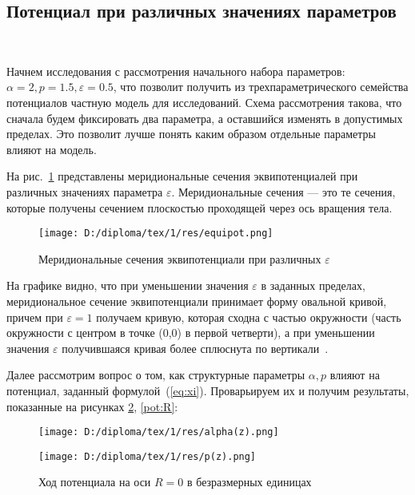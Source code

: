 \subsection{Потенциал при различных значениях параметров}

~\par
Начнем исследования с рассмотрения начального набора параметров: $\alpha = 2, p = 1.5, \varepsilon = 0.5$, что позволит получить из трехпараметрического семейства потенциалов частную модель для исследований. Схема рассмотрения такова, что сначала будем фиксировать два параметра, а оставшийся изменять в допустимых пределах. Это позволит лучше понять каким образом отдельные параметры влияют на модель.\par
На рис.~\ref{equipot} представлены меридиональные сечения эквипотенциалей при различных значениях параметра $\varepsilon$. Меридиональные сечения --- это те сечения, которые получены сечением плоскостью проходящей через ось вращения тела.

{
\begin{figure}[H]
    \centering
    \texttt{[image: D:/diploma/tex/1/res/equipot.png]}
    \caption{Меридиональные сечения эквипотенциали при различных $\varepsilon$}\label{equipot}
\end{figure}
}
{\flushleft На графике видно, что при уменьшении значения $\varepsilon$ в заданных пределах, меридиональное сечение эквипотенциали принимает форму овальной кривой, причем при $\varepsilon=1$ получаем кривую, которая сходна с частью окружности (часть окружности с центром в точке (0,0) в первой четверти), а при уменьшении значения $\varepsilon$ получившаяся кривая более сплюснута по вертикали~\cite{RaspopvaOssipkovJiang}.\par}
Далее рассмотрим вопрос о том, как структурные параметры $\alpha, p$ влияют на потенциал, заданный формулой~(\ref{eq:xi}). Проварьируем их и получим результаты, показанные на рисунках \ref{pot:z}, \ref{pot:R}:

\begin{figure}[H]
\centering
\begin{minipage}[t]{0.49\textwidth}
\centering
\texttt{[image: D:/diploma/tex/1/res/alpha(z).png]}
\end{minipage}\hfill
\begin{minipage}[b]{0.49\linewidth}
\centering \texttt{[image: D:/diploma/tex/1/res/p(z).png]}
\end{minipage}
\caption{Ход потенциала на оси $R=0$ в безразмерных единицах}\label{pot:z}
\end{figure}


